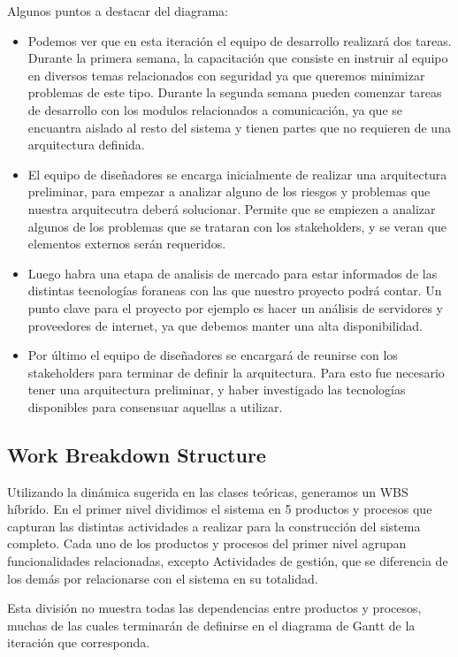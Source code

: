 Algunos puntos a destacar del diagrama:
\begin{itemize}
 \item Podemos ver que en esta iteración el equipo de desarrollo realizará dos tareas. Durante la primera semana, la capacitación que consiste en instruir al equipo en diversos temas relacionados con seguridad ya que queremos minimizar problemas de este tipo. Durante la segunda semana pueden comenzar tareas de desarrollo con los modulos relacionados a comunicación, ya que se encuantra aislado al resto del sistema y tienen partes que no requieren de una arquitectura definida.
 \item El equipo de diseñadores se encarga inicialmente de realizar una arquitectura preliminar, para empezar a analizar alguno de los riesgos y problemas que nuestra arquitecutra deberá solucionar. Permite que se empiezen a analizar algunos de los problemas que se trataran con los stakeholders, y se veran que elementos externos serán requeridos.
 \item Luego habra una etapa de analisis de mercado para estar informados de las distintas tecnologías foraneas con las que nuestro proyecto podr\'a contar. Un punto clave para el proyecto por ejemplo es hacer un an\'alisis de servidores y proveedores de internet, ya que debemos manter una alta disponibilidad.
 \item Por último el equipo de diseñadores se encargará de reunirse con los stakeholders para terminar de definir la arquitectura. Para esto fue necesario tener una arquitectura preliminar, y haber investigado las tecnologías disponibles para consensuar aquellas a utilizar. 
\end{itemize}
\renewcommand{\labelitemi}{}


\subsection{Work Breakdown Structure} 

Utilizando la dinámica sugerida en las clases teóricas, generamos un WBS híbrido. En el primer nivel dividimos el sistema en 5 productos y procesos que capturan las distintas actividades a realizar para la construcción del sistema completo. Cada uno de los productos y procesos del primer nivel agrupan funcionalidades relacionadas, excepto Actividades de gestión, que se diferencia de los demás por relacionarse con el sistema en su totalidad.

Esta división no muestra todas las dependencias entre productos y procesos, muchas de las cuales terminarán de definirse en el diagrama de Gantt de la iteración que corresponda.
\\ \par

